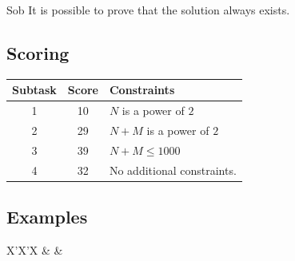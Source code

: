 \begin{statement}[
  problempoints=110,
  timelimit=1 second,
  memorylimit=512 MiB,
]{Sob}
It is possible to prove that the solution always exists.

 \subsection*{Scoring}
{\renewcommand{\arraystretch}{1.4}
  \setlength{\tabcolsep}{6pt}
  \begin{tabular}{ccl}
 Subtask & Score & Constraints \\ \midrule
  1 & 10 & $N$ is a power of $2$ \\
  2 & 29 & $N + M$ is a power of $2$ \\
  3 & 39 & $N + M \le 1000$ \\
  4 & 32 & No additional constraints.
\end{tabular}}

\subsection*{Examples}
\begin{tabularx}{\textwidth}{X'X'X}
 &
 &
\end{tabularx}

\end{statement}

